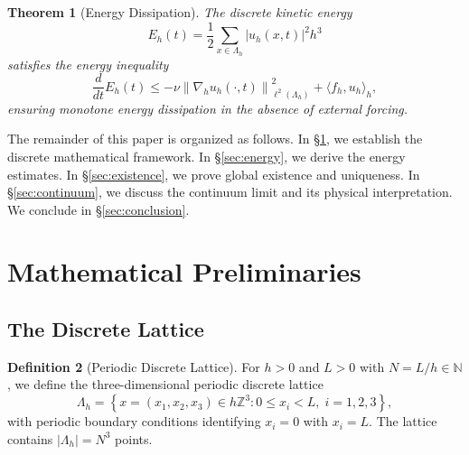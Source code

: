 \documentclass[12pt, a4paper]{article}
\theoremstyle{plain}
\newtheorem{theorem}{Theorem}[section]
\theoremstyle{definition}
\newtheorem{definition}[theorem]{Definition}
\theoremstyle{remark}
\newcommand{\Z}{\mathbb{Z}}
\newcommand{\N}{\mathbb{N}}
\newcommand{\norm}[1]{\left\| #1 \right\|}
\newcommand{\abs}[1]{\left| #1 \right|}
\newcommand{\inner}[2]{\langle #1, #2 \rangle}
\newcommand{\grad}{\nabla_h}
\newcommand{\uh}{u_h}
\begin{document}
\begin{theorem}[Energy Dissipation]\label{thm:energy}
  The discrete kinetic energy
  \begin{equation}
    E_h(t) = \frac{1}{2} \sum_{x \in \Lambda_h} \abs{\uh(x,t)}^2 h^3
  \end{equation}
  satisfies the energy inequality
  \begin{equation}\label{eq:energy_ineq}
    \frac{d}{dt} E_h(t) \leq -\nu \norm{\grad \uh(\cdot, t)}_{\ell^2(\Lambda_h)}^2 + \inner{f_h}{\uh}_h,
  \end{equation}
  ensuring monotone energy dissipation in the absence of external forcing.
\end{theorem}

The remainder of this paper is organized as follows. In \S\ref{sec:prelim},
we establish the discrete mathematical framework. In \S\ref{sec:energy}, we
derive the energy estimates. In \S\ref{sec:existence}, we prove global existence
and uniqueness. In \S\ref{sec:continuum}, we discuss the continuum limit and its
physical interpretation. We conclude in \S\ref{sec:conclusion}.

\section{Mathematical Preliminaries}\label{sec:prelim}

\subsection{The Discrete Lattice}

\begin{definition}[Periodic Discrete Lattice]\label{def:lattice}
  For $h > 0$ and $L > 0$ with $N = L/h \in \N$, we define the three-dimensional
  periodic discrete lattice
  \begin{equation}
    \Lambda_h = \left\{ x = (x_1, x_2, x_3) \in h\Z^3 : 0 \leq x_i < L, \; i = 1,2,3 \right\},
  \end{equation}
  with periodic boundary conditions identifying $x_i = 0$ with $x_i = L$.
  The lattice contains $|\Lambda_h| = N^3$ points.
\end{definition}
\end{document}
